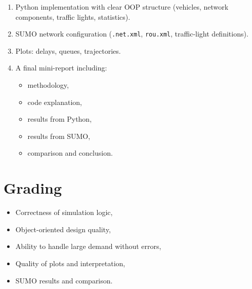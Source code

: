 \documentclass{KPS_assignment}
\begin{document}
\begin{enumerate}
    \item Python implementation with clear OOP structure (vehicles, network components, traffic lights, statistics).
    \item SUMO network configuration (\texttt{.net.xml}, \texttt{rou.xml}, traffic-light definitions).
    \item Plots: delays, queues, trajectories.
    \item A final mini-report including:
    \begin{itemize}
        \item methodology,
        \item code explanation,
        \item results from Python,
        \item results from SUMO,
        \item comparison and conclusion.
    \end{itemize}
\end{enumerate}

\section*{Grading}

\begin{itemize}
    \item Correctness of simulation logic,
    \item Object-oriented design quality,
    \item Ability to handle large demand without errors,
    \item Quality of plots and interpretation,
    \item SUMO results and comparison.
\end{itemize}
\end{document}
